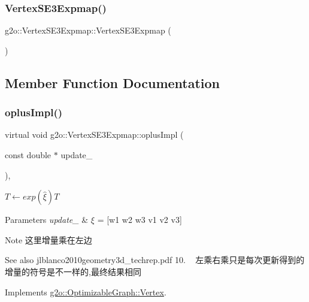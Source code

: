 \subsubsection{\texorpdfstring{Vertex\+S\+E3\+Expmap()}{VertexSE3Expmap()}}
{\footnotesize\ttfamily g2o\+::\+Vertex\+S\+E3\+Expmap\+::\+Vertex\+S\+E3\+Expmap (\begin{DoxyParamCaption}{ }\end{DoxyParamCaption})}



\subsection{Member Function Documentation}
\mbox{\label{classg2o_1_1_vertex_s_e3_expmap_a52592993e7ab5de6fe4bb0f9e00c4d39}} 
\subsubsection{\texorpdfstring{oplus\+Impl()}{oplusImpl()}}
{\footnotesize\ttfamily virtual void g2o\+::\+Vertex\+S\+E3\+Expmap\+::oplus\+Impl (\begin{DoxyParamCaption}\item[{const double $\ast$}]{update\+\_\+ }\end{DoxyParamCaption})\hspace{0.3cm}{\ttfamily [inline]}, {\ttfamily [virtual]}}

$ T \leftarrow exp(\hat{\xi})T $ 
\begin{DoxyParams}{Parameters}
{\em update\+\_\+} & $ \xi $ = \mbox{[}w1 w2 w3 v1 v2 v3\mbox{]} \\
\hline
\end{DoxyParams}
\begin{DoxyNote}{Note}
这里增量乘在左边 
\end{DoxyNote}
\begin{DoxySeeAlso}{See also}
jlblanco2010geometry3d\+\_\+techrep.\+pdf 10. ~\newline
 左乘右乘只是每次更新得到的增量的符号是不一样的,最终结果相同 
\end{DoxySeeAlso}


Implements \mbox{\hyperlink{classg2o_1_1_optimizable_graph_1_1_vertex_a4537a46afb8d12c3f18c88ba9601c625}{g2o\+::\+Optimizable\+Graph\+::\+Vertex}}.

